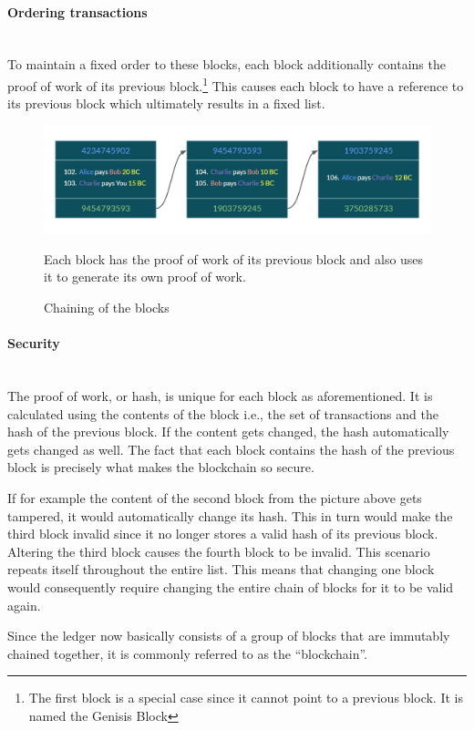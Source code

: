 \documentclass[a4paper, 12pt]{report}
\begin{document}
\paragraph{Ordering transactions} \hspace{0pt} \\
To maintain a fixed order to these blocks, each block additionally contains the proof of work of its previous block.\footnote{The first block is a special case since it cannot point to a previous block. It is named the Genisis Block} This causes each block to have a reference to its previous block which ultimately results in a fixed list.

\begin{figure}[h]
	\includegraphics[width=\textwidth]{03_Linked_Blocks}
	\caption{Chaining of the blocks}
	\small Each block has the proof of work of its previous block and also uses it to generate its own proof of work.
	\medskip
	\label{fig:03_Linked_Blocks}
\end{figure}

\paragraph{Security} \hspace{0pt} \\
The proof of work, or hash, is unique for each block as aforementioned. It is calculated using the contents of the block i.e., the set of transactions and the hash of the previous block. If the content gets changed, the hash automatically gets changed as well. The fact that each block contains the hash of the previous block is precisely what makes the blockchain so secure. 
\par If for example the content of the second block from the picture above gets tampered, it would automatically change its hash. This in turn would make the third block invalid since it no longer stores a valid hash of its previous block. Altering the third block causes the fourth block to be invalid. This scenario repeats itself throughout the entire list. This means that changing one block would consequently require changing the entire chain of blocks for it to be valid again. 
\par Since the ledger now basically consists of a group of blocks that are immutably chained together, it is commonly referred to as the “blockchain”. 
\end{document}
